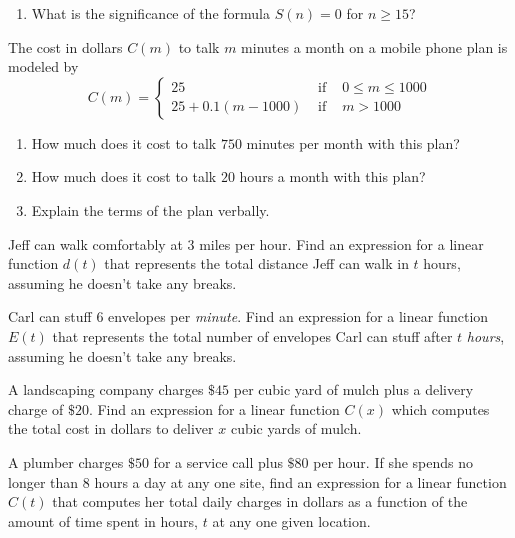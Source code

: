 \begin{exenum}
\begin{enumerate}
\item  What is the significance of the formula $S(n) = 0$ for $n \geq 15$?

\end{enumerate}

\item  \label{piecewisemobile} The cost in dollars $C(m)$  to talk $m$ minutes a month on a mobile phone plan is modeled by   \[{\displaystyle C(m) = \left\{ \begin{array}{rcl} 25 & \mbox{ if } & 0 \leq m \leq 1000 \\
                                                            25+0.1(m-1000) & \mbox{ if } & m > 1000
                                     \end{array} \right. }\]

\begin{enumerate}

\item  How much does it cost to talk $750$ minutes per month with this plan?

\item  How much does it cost to talk $20$ hours a month with this plan?

\item  Explain the terms of the plan verbally.
\end{enumerate}

\item  Jeff can walk comfortably at $3$ miles per hour.  Find an expression for a linear function $d(t)$ that represents the total distance Jeff can walk in $t$ hours, assuming he doesn't take any breaks.

\item  Carl can stuff $6$ envelopes per \textit{minute}.  Find an expression for a linear function $E(t)$ that represents the total number of envelopes Carl can stuff after $t$ \textit{hours}, assuming he doesn't take any breaks.

\item  A landscaping company charges $\$45$ per cubic yard of mulch plus a delivery charge of $\$20$.  Find an expression for a  linear function $C(x)$ which computes the total cost in dollars  to deliver $x$ cubic yards of mulch.

\item  A plumber charges $\$50$ for a service call plus $\$80$ per hour.  If she spends no longer than 8 hours a day at any one site, find an expression for a  linear function $C(t)$ that computes her total daily charges in dollars as a function of the amount of time spent in hours, $t$  at any one given location.


\end{exenum}
